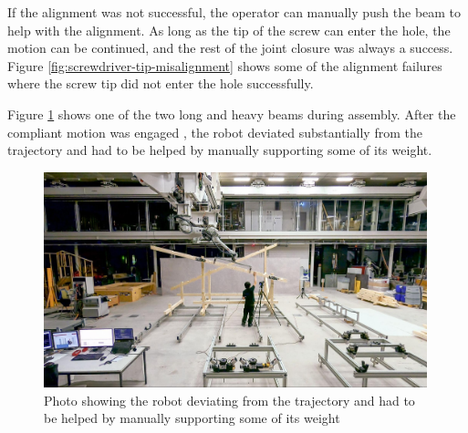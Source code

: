 If the alignment was not successful, the operator can manually push the beam to help with the alignment. As long as the tip of the screw can enter the hole, the motion can be continued, and the rest of the joint closure was always a success. Figure \ref{fig:screwdriver-tip-misalignment} shows some of the alignment failures where the screw tip did not enter the hole successfully. 

Figure \ref{fig:beam-heavy-need-help} shows one of the two long and heavy beams during assembly. After the compliant motion was engaged , the robot deviated substantially from the trajectory and had to be helped by manually supporting some of its weight.

\begin{figure}[!h]
    \centering
    \includegraphics[width=0.99\textwidth]{images/7b/img82.jpg}
    \caption{Photo showing the robot deviating from the trajectory and had to be helped by manually supporting some of its weight}
    \label{fig:beam-heavy-need-help}
\end{figure}

